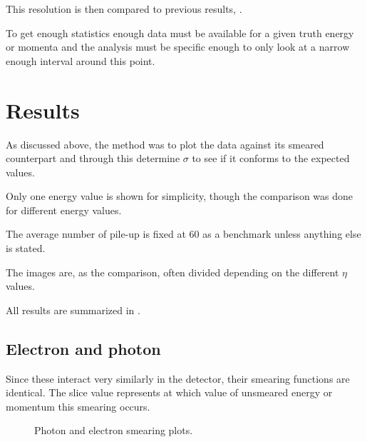 This resolution is then compared to previous results, \citep{ATL-PHYS-PUB-2013-004}.

To get enough statistics enough data must be available for a given truth energy or momenta and the analysis must be specific enough to only look at a narrow enough interval around this point.
\newpage
\section{Results}\label{cha:vali:sec:results}
As discussed above, the method was to plot the data against its smeared counterpart and through this determine $\sigma$ to see if it conforms to the expected values.

Only one energy value is shown for simplicity, though the comparison was done for different energy values.

The average number of pile-up is fixed at 60 as a benchmark unless anything else is stated.

The images are, as the comparison, often divided depending on the different $\eta$ values.

All results are summarized in . 
\newpage
\subsection{Electron and photon}
Since these interact very  similarly in the detector, their smearing functions are identical.
The slice value represents at which value of unsmeared energy or momentum this smearing occurs. 


 \begin{figure}[H] %
    \hfill
{}
    \hfill
    \hfill
{}
    \caption{Photon and electron smearing plots.}
    \label{fig:elph}
\end{figure}
\newpage
